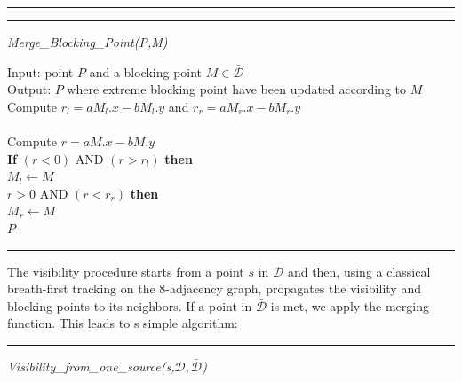 \documentclass{llncs}
\begin{document}
\footnotesize
\vspace{0.5cm}
\hrule
\hrule\vspace*{0.3cm}\centerline{{\it Merge\_Blocking\_Point(P,M)}}
\noindent \textsf{Input: point $P$ and a blocking point $M\in\bar{\mathcal{D}}$\\
\noindent Output: $P$ where extreme blocking point have been updated according to $M$
\\
\hspace*{0.5cm} Compute $r_l=aM_l.x-bM_l.y$ and $r_r=aM_r.x-bM_r.y$\\
\hspace*{1cm}{\it (if $M_l$ (resp. $M_l$) is not defined $r_l=-b$ (resp. $r_r=b$))}\\
\hspace*{0.5cm} Compute $r=aM.x-bM.y$\\
\hspace*{0.5cm} {\bf If} $(r<0)$ AND $(r>r_l)$ {\bf then}\\
\hspace*{1cm} $M_l\leftarrow M$\\
\hspace*{0.5cm}{\bf Else If} $r>0$ AND $(r<r_r)$ {\bf then}\\
\hspace*{1cm} $M_r\leftarrow M$\\
\hspace*{0.5cm}{\bf Return} $P$
}\\
\hrule
\normalsize

The visibility procedure starts from a point $s$ in $\mathcal{D}$ and then, using a classical
 breath-first tracking on the 8-adjacency graph,  propagates the visibility and blocking points to
 its neighbors. If a point in $\bar{\mathcal{D}}$ is met, we apply the merging function. This leads
 to s simple algorithm:


\footnotesize
\vspace{0.5cm}
\hrule\vspace*{0.3cm}
\centerline{{\it Visibility\_from\_one\_source(s,$\mathcal{D},\bar{\mathcal{D}}$)}}
\end{document}
